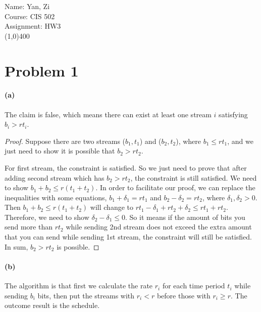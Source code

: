 \documentclass[letter,12pt]{article}
\begin{document}
Name: Yan, Zi \\
Course: CIS 502 \\
Assignment: HW3 \\
\line(1,0){400}

\section*{Problem 1}
\paragraph*{(a)}
The claim is false, which means there can exist at least one stream $i$
satisfying $b_i > rt_i$.

\begin{proof}
Suppose there are two streams ($b_1, t_1$) and ($b_2, t_2$), where
$b_1 \le rt_1$, and we just need to show it is possible that $b_2 > rt_2$.

For first stream, the constraint is satisfied. So we just need to prove
that after adding second stream which has $b_2 > rt_2$, the constraint
is still satisfied. We need to show $b_1+b_2 \le r(t_1 + t_2)$. In order
to facilitate our proof, we can replace the inequalities with some equations,
$b_1 + \delta_1 = rt_1$ and $b_2 - \delta_2 = rt_2$, where $\delta_1,
\delta_2 > 0$. Then $b_1+b_2 \le r(t_1 + t_2)$ will change to $rt_1 - 
\delta_1 + rt_2 + \delta_2 \le rt_1 + rt_2$. Therefore, we need to show
$\delta_2 - \delta_1 \le 0$. So it means if the amount of bits you send
more than $rt_2$ while sending 2nd stream does not exceed the extra 
amount that you can send while sending 1st stream, the constraint will
still be satisfied. In sum, $b_2 > rt_2$ is possible.
\end{proof}

\paragraph*{(b)}
The algorithm is that first we calculate the rate $r_i$ for each time period
$t_i$ while sending $b_i$ bits, then put the streams with $r_i < r$ before
those with $r_i \geq r$. The outcome result is the schedule.
\end{document}

